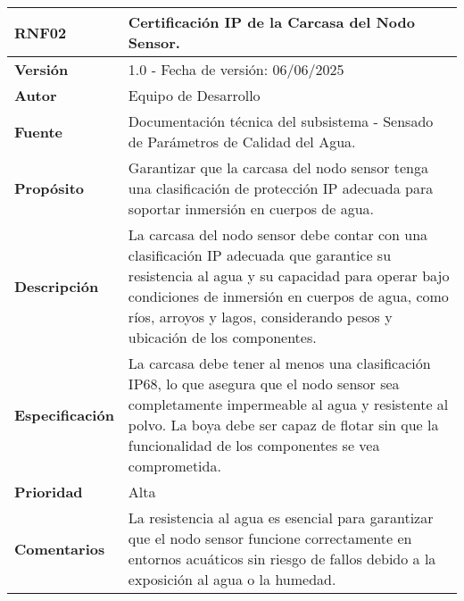 \begin{longtable}{|l|p{12cm}|}
\hline
\textbf{RNF02} & \textbf{Certificación IP de la Carcasa del Nodo Sensor.} \\
\hline
\endfirsthead
\hline
\textbf{Versión} & 1.0 - Fecha de versión: 06/06/2025 \\
\hline
\textbf{Autor} & Equipo de Desarrollo \\
\hline
\textbf{Fuente} & Documentación técnica del subsistema - Sensado de Parámetros de Calidad del Agua. \\
\hline
\textbf{Propósito} & Garantizar que la carcasa del nodo sensor tenga una clasificación de protección IP adecuada para soportar inmersión en cuerpos de agua. \\
\hline
\textbf{Descripción} & La carcasa del nodo sensor debe contar con una clasificación IP adecuada que garantice su resistencia al agua y su capacidad para operar bajo condiciones de inmersión en cuerpos de agua, como ríos, arroyos y lagos, considerando pesos y ubicación de los componentes. \\
\hline
\textbf{Especificación} & La carcasa debe tener al menos una clasificación IP68, lo que asegura que el nodo sensor sea completamente impermeable al agua y resistente al polvo. La boya debe ser capaz de flotar sin que la funcionalidad de los componentes se vea comprometida. \\
\hline
\textbf{Prioridad} & Alta \\
\hline
\textbf{Comentarios} & La resistencia al agua es esencial para garantizar que el nodo sensor funcione correctamente en entornos acuáticos sin riesgo de fallos debido a la exposición al agua o la humedad. \\
\hline
\end{longtable}

